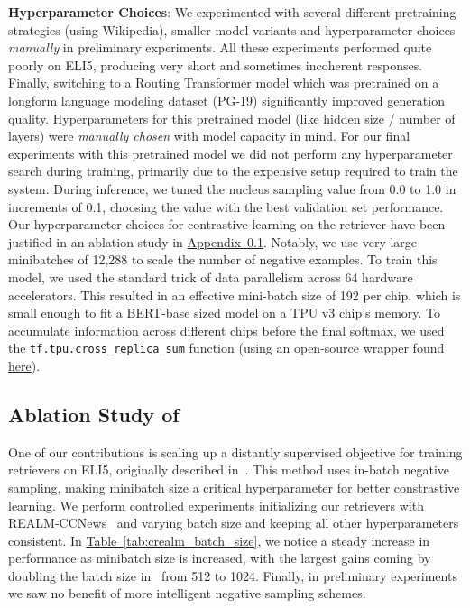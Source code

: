 \documentclass[11pt]{article}
\newcommand{\namedref}[2]{\hyperref[#2]{#1~\ref*{#2}}}
\newcommand{\tableref}[1]{\namedref{Table}{#1}}
\newcommand{\appendixref}[1]{\namedref{Appendix}{#1}}
\newcommand{\retriever}[1]{\textsc{c-REALM}}
\begin{document}
\noindent \textbf{Hyperparameter Choices}: We experimented with several different pretraining strategies (using Wikipedia), smaller model variants and hyperparameter choices \emph{manually} in preliminary experiments. All these experiments performed quite poorly on ELI5, producing very short and sometimes incoherent responses. Finally, switching to a Routing Transformer model which was pretrained on a longform language modeling dataset (PG-19) significantly improved generation quality. Hyperparameters for this pretrained model (like hidden size / number of layers) were \emph{manually chosen} with model capacity in mind. For our final experiments with this pretrained model we did not perform any hyperparameter search during training, primarily due to the expensive setup required to train the system. During inference, we tuned the nucleus sampling value from 0.0 to 1.0 in increments of 0.1, choosing the value with the best validation set performance. Our hyperparameter choices for contrastive learning on the retriever have been justified in an ablation study in \appendixref{appendix:ablation_batch_size}. Notably, we use very large minibatches of 12,288 to scale the number of negative examples. To train this model, we used the standard trick of data parallelism across 64 hardware accelerators. This resulted in an effective mini-batch size of 192 per chip, which is small enough to fit a BERT-base sized model on a TPU v3 chip's memory. To accumulate information across different chips before the final softmax, we used the \texttt{tf.tpu.cross\_replica\_sum} function (using an open-source wrapper found \href{https://github.com/google-research/language/blob/master/language/common/utils/tpu_utils.py#L83}{here}).

\subsection{Ablation Study of \retriever}
\label{appendix:ablation_batch_size}

One of our contributions is scaling up a distantly supervised objective for training retrievers on ELI5, originally described in~\citet{jernite2020}. This method uses in-batch negative sampling, making minibatch size a critical hyperparameter for better constrastive learning. We perform controlled experiments initializing our retrievers with REALM-CCNews~\citep{guu2020realm} and varying batch size and keeping all other hyperparameters consistent. In \tableref{tab:crealm_batch_size}, we notice a steady increase in performance as minibatch size is increased, with the largest gains coming by doubling the batch size in~\citet{jernite2020} from 512 to 1024. Finally, in preliminary experiments we saw no benefit of more intelligent negative sampling schemes.
\end{document}
